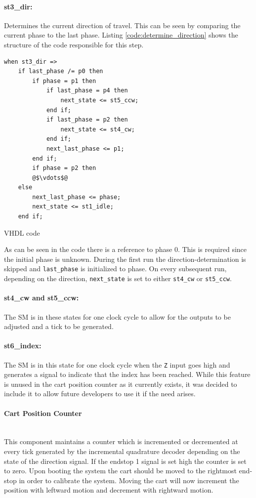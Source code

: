 \paragraph{st3\_dir:} %
Determines the current direction of travel.
This can be seen by comparing the current phase to the last phase.
Listing \ref{code:determine_direction} shows the structure of the code responsible for this step.
\begin{listing}[h]
\begin{verbatim}
when st3_dir =>
	if last_phase /= p0 then
	    if phase = p1 then
	        if last_phase = p4 then
	            next_state <= st5_ccw;
	        end if;
	        if last_phase = p2 then
	            next_state <= st4_cw;
	        end if;
	        next_last_phase <= p1;
	    end if;
	    if phase = p2 then
	    @$\vdots$@
    else
        next_last_phase <= phase;
        next_state <= st1_idle;
    end if;
\end{verbatim}
\caption{VHDL code}
\label{code:determine_direction}
\end{listing}
As can be seen in the code there is a reference to phase 0.
This is required since the initial phase is unknown.
During the first run the direction-determination is skipped and \texttt{last\_phase} is initialized to phase.
On every subsequent run, depending on the direction, \texttt{next\_state} is set to either \texttt{st4\_cw} or \texttt{st5\_ccw}.
\paragraph{st4\_cw and st5\_ccw:} %
The SM is in these states for one clock cycle to allow for the outputs to be adjusted and a tick to be generated.
\paragraph{st6\_index:} %
The SM is in this state for one clock cycle when the \texttt{Z} input goes high and generates a signal to indicate that the index has been reached.
While this feature is unused in the cart position counter as it currently exists, it was decided to include it to allow future developers to use it if the need arises.

\paragraph{Cart Position Counter}~\\ %
\label{par:cart_position_counter}
This component maintains a counter which is incremented or decremented at every tick generated by the incremental quadrature decoder depending on the state of the direction signal.
If the endstop 1 signal is set high the counter is set to zero.
Upon booting the system the cart should be moved to the rightmost end-stop in order to calibrate the system.
Moving the cart will now increment the position with leftward motion and decrement with rightward motion.

